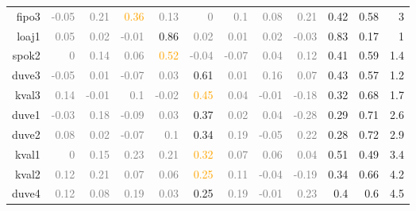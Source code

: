 \documentclass[10pt,a4paper]{article}
\begin{document}
\begin{table}[htbp]
\begin{tabular}{r|rrrrrrrr|rrr}
    fipo3 & \textcolor{Gray}{-0.05} & \textcolor{Gray}{0.21} & \textcolor{Orange}{0.36} & \textcolor{Gray}{0.13} & \textcolor{Gray}{0   } & \textcolor{Gray}{0.1 } & \textcolor{Gray}{0.08} & \textcolor{Gray}{0.21} & 0.42 & 0.58 & 3 \\
    loaj1 & \textcolor{Gray}{0.05} & \textcolor{Gray}{0.02} & \textcolor{Gray}{-0.01} & \textcolor{NavyBlue}{0.86} & \textcolor{Gray}{0.02} & \textcolor{Gray}{0.01} & \textcolor{Gray}{0.02} & \textcolor{Gray}{-0.03} & 0.83 & 0.17 & 1\\
    spok2 & \textcolor{Gray}{0   } & \textcolor{Gray}{0.14} & \textcolor{Gray}{0.06} & \textcolor{Orange}{0.52} & \textcolor{Gray}{-0.04} & \textcolor{Gray}{-0.07} & \textcolor{Gray}{0.04} & \textcolor{Gray}{0.12} & 0.41 & 0.59 & 1.4 \\
    duve3 & \textcolor{Gray}{-0.05} & \textcolor{Gray}{0.01} & \textcolor{Gray}{-0.07} & \textcolor{Gray}{0.03} & \textcolor{NavyBlue}{0.61} & \textcolor{Gray}{0.01} & \textcolor{Gray}{0.16} & \textcolor{Gray}{0.07} & 0.43 & 0.57 & 1.2 \\
    kval3 & \textcolor{Gray}{0.14} & \textcolor{Gray}{-0.01} & \textcolor{Gray}{0.1 } & \textcolor{Gray}{-0.02} & \textcolor{Orange}{0.45} & \textcolor{Gray}{0.04} & \textcolor{Gray}{-0.01} & \textcolor{Gray}{-0.18} & 0.32 & 0.68 & 1.7 \\
    duve1 & \textcolor{Gray}{-0.03} & \textcolor{Gray}{0.18} & \textcolor{Gray}{-0.09} & \textcolor{Gray}{0.03} & \textcolor{NavyBlue}{0.37} & \textcolor{Gray}{0.02} & \textcolor{Gray}{0.04} & \textcolor{Gray}{-0.28} & 0.29 & 0.71 & 2.6 \\
    duve2 & \textcolor{Gray}{0.08} & \textcolor{Gray}{0.02} & \textcolor{Gray}{-0.07} & \textcolor{Gray}{0.1 } & \textcolor{NavyBlue}{0.34} & \textcolor{Gray}{0.19} & \textcolor{Gray}{-0.05} & \textcolor{Gray}{0.22} & 0.28 & 0.72 & 2.9 \\
    kval1 & \textcolor{Gray}{0   } & \textcolor{Gray}{0.15} & \textcolor{Gray}{0.23} & \textcolor{Gray}{0.21} & \textcolor{Orange}{0.32} & \textcolor{Gray}{0.07} & \textcolor{Gray}{0.06} & \textcolor{Gray}{0.04} & 0.51 & 0.49 & 3.4 \\
    kval2 & \textcolor{Gray}{0.12} & \textcolor{Gray}{0.21} & \textcolor{Gray}{0.07} & \textcolor{Gray}{0.06} & \textcolor{Orange}{0.25} & \textcolor{Gray}{0.11} & \textcolor{Gray}{-0.04} & \textcolor{Gray}{-0.19} & 0.34 & 0.66 & 4.2 \\
    duve4 & \textcolor{Gray}{0.12} & \textcolor{Gray}{0.08} & \textcolor{Gray}{0.19} & \textcolor{Gray}{0.03} & \textcolor{NavyBlue}{0.25} & \textcolor{Gray}{0.19} & \textcolor{Gray}{-0.01} & \textcolor{Gray}{0.23} & 0.4 & 0.6 & 4.5 \\

\end{tabular}
\end{table}
\end{document}
